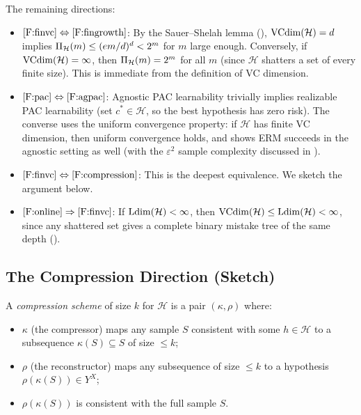The remaining directions:

\begin{itemize}[leftmargin=*,itemsep=4pt]
\item $\ref{F:finvc} \Leftrightarrow \ref{F:fingrowth}$:  By the Sauer--Shelah
  lemma (), $\mathrm{VCdim}(\mathcal{H}) = d$ implies
  $\Pi_\mathcal{H}(m) \leq (em/d)^d < 2^m$ for $m$ large enough.
  Conversely, if $\mathrm{VCdim}(\mathcal{H}) = \infty$, then $\Pi_\mathcal{H}(m) =
  2^m$ for all $m$ (since $\mathcal{H}$ shatters a set of every finite size).
  This is immediate from the definition of VC dimension.

\item $\ref{F:pac} \Leftrightarrow \ref{F:agpac}$:  Agnostic PAC learnability
  trivially implies realizable PAC learnability (set $c^* \in \mathcal{H}$, so
  the best hypothesis has zero risk).  The converse uses the uniform
  convergence property: if $\mathcal{H}$ has finite VC dimension, then uniform
  convergence holds, and  shows ERM succeeds in the agnostic
  setting as well (with the $\varepsilon^2$ sample complexity discussed in
  ).

\item $\ref{F:finvc} \Leftrightarrow \ref{F:compression}$:  This is the deepest
  equivalence.  We sketch the argument below.

\item $\ref{F:online} \Rightarrow \ref{F:finvc}$: If $\mathrm{Ldim}(\mathcal{H}) < \infty$,
  then $\mathrm{VCdim}(\mathcal{H}) \leq \mathrm{Ldim}(\mathcal{H}) < \infty$, since any shattered
  set gives a complete binary mistake tree of the same depth ().
\end{itemize}


\subsection{The Compression Direction (Sketch)}
\label{sec:compression-direction}

\begin{defn}
\label{def:compression}
A \emph{compression scheme} of size $k$ for $\mathcal{H}$ is a pair
$(\kappa, \rho)$ where:
\begin{itemize}[nosep]
\item $\kappa$ (the compressor) maps any sample $S$ consistent with some
  $h \in \mathcal{H}$ to a subsequence $\kappa(S) \subseteq S$ of size
  $\leq k$;
\item $\rho$ (the reconstructor) maps any subsequence of size $\leq k$ to a
  hypothesis $\rho(\kappa(S)) \in Y^X$;
\item $\rho(\kappa(S))$ is consistent with the full sample $S$.
\end{itemize}
\end{defn}

